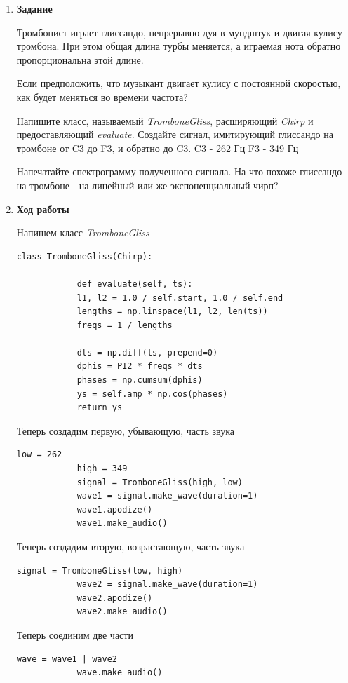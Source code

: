 \documentclass[a4paper,12pt]{article}
\begin{document}
	\begin{enumerate}
		
		\item \textbf{Задание}
		
		Тромбонист играет глиссандо, непрерывно дуя в мундштук и двигая кулису тромбона. При этом общая длина турбы меняется, а играемая нота обратно пропорциональна этой длине.
		
		Если предположить, что музыкант двигает кулису с постоянной скоростью, как будет меняться во времени частота?
		
		Напишите класс, называемый \textit{TromboneGliss}, расширяющий \textit{Chirp} и предоставляющий \textit{evaluate}. Создайте сигнал, имитирующий глиссандо на тромбоне от C3 до F3, и обратно до C3.
		C3 - 262 Гц
		F3 - 349 Гц
		
		Напечатайте спектрограмму полученного сигнала. На что похоже глиссандо на тромбоне - на линейный или же экспоненциальный чирп?
		
		\item \textbf{Ход работы}
		
		Напишем класс \textit{TromboneGliss}
		\begin{lstlisting}[caption=Класс \textit{TromboneGliss}]
			class TromboneGliss(Chirp):
			
			def evaluate(self, ts):
			l1, l2 = 1.0 / self.start, 1.0 / self.end
			lengths = np.linspace(l1, l2, len(ts))
			freqs = 1 / lengths
			
			dts = np.diff(ts, prepend=0)
			dphis = PI2 * freqs * dts
			phases = np.cumsum(dphis)
			ys = self.amp * np.cos(phases)
			return ys
		\end{lstlisting}
		
		Теперь создадим первую, убывающую, часть звука
		\begin{lstlisting}[caption=Создание убывающей части звука]
			low = 262
			high = 349
			signal = TromboneGliss(high, low)
			wave1 = signal.make_wave(duration=1)
			wave1.apodize()
			wave1.make_audio()
		\end{lstlisting}
		
		Теперь создадим вторую, возрастающую, часть звука
		\begin{lstlisting}[caption=Создание возрастающей части звука]
			signal = TromboneGliss(low, high)
			wave2 = signal.make_wave(duration=1)
			wave2.apodize()
			wave2.make_audio()
		\end{lstlisting}
		
		Теперь соединим две части
		\begin{lstlisting}[caption=Соединение двух частей]
			wave = wave1 | wave2
			wave.make_audio()
		\end{lstlisting}
		

\end{enumerate}
\end{document}
